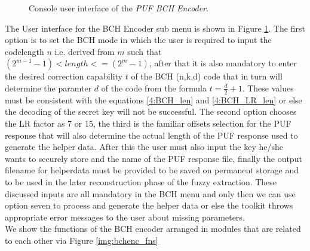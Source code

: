 	\begin{figure}
	\centering
	\caption{Console user interface of the \emph{PUF BCH Encoder}.}
	\label{img:4_BCH_ENC_menu}
	\end{figure}
	The User interface for the BCH Encoder sub menu is shown in Figure \ref{img:4_BCH_ENC_menu}. The first option is to set the BCH mode in which the user is required to input the codelength $n$ i.e. derived from $m$ such that $(2^{m-1} - 1) < length <= (2^m - 1)$, after that it is also mandatory to enter the desired correction capability $t$ of the BCH (n,k,d) code that in turn will determine the paramter $d$ of the code from the formula $t = \frac{d}{2} + 1$.
	These values must be consistent with the equations \ref{4:BCH_len} and \ref{4:BCH_LR_len} or else the decoding of the secret key will not be successful. The second option chooses the LR factor as 7 or 15, the third is the familiar offsets selection for the PUF response that will also determine the actual length of the PUF response used to generate the helper data. After this the user must also input the key he/she wants to securely store and the name of the PUF
	response file, finally the output filename for helperdata must be provided to be saved on permanent storage and to be used in the later reconstruction phase of the fuzzy extraction. These discussed inputs are all mandatory in the BCH menu and only then we can use option seven to process and generate the helper data or else the toolkit throws appropriate error messages to the user about missing parameters.\\

	We show the functions of the BCH encoder arranged in modules that are related to each other via Figure \ref{img:bchenc_fns}

